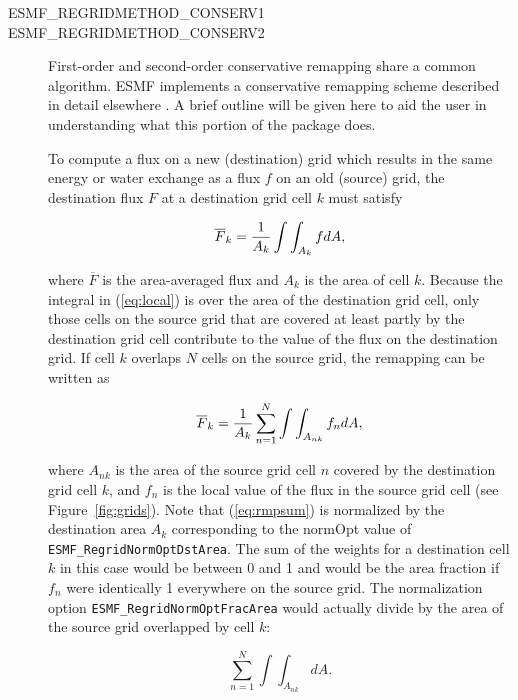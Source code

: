 \begin{description}
\item[ESMF\_REGRIDMETHOD\_CONSERV1]
\item[ESMF\_REGRIDMETHOD\_CONSERV2]
     First-order and second-order conservative remapping share a common algorithm.
     ESMF implements a conservative remapping scheme described in detail
     elsewhere \cite{Jones1999}.  A brief outline will be given
     here to aid the user in understanding what this portion of the package does.

     To compute a flux on a new (destination) grid which results in the same
     energy or water exchange as a flux $f$ on an old (source) grid, the
     destination flux $F$ at a destination grid cell $k$ must satisfy

\begin{equation}\label{eq:local}
\overline{F}_k = {1\over{A_k}}\int\int_{A_k} fdA,
\end{equation}

     where $\overline{F}$ is the area-averaged flux and $A_k$ is the area of
     cell $k$. Because the integral in (\ref{eq:local}) is over the area of 
     the destination grid cell, only those cells on the source grid that are
     covered at least partly by the destination grid cell contribute to the
     value of the flux on the destination grid.  If cell $k$ overlaps $N$ cells
     on the source grid, the remapping can be written as 

\begin{equation}\label{eq:rmpsum}
\overline{F}_k = 
{1\over{A_k}} \sum_{n=1}^N \int\int_{A_{nk}} f_ndA,
\end{equation}

     where $A_{nk}$ is the area of the source grid cell $n$ covered by the
     destination grid cell $k$, and $f_n$ is the local value of the flux in the
     source grid cell (see Figure~\ref{fig:grids}).  Note that (\ref{eq:rmpsum})
     is normalized by the destination area $A_k$ corresponding to the
     normOpt value of {\tt ESMF\_RegridNormOptDstArea}.  The sum of the weights for a
     destination cell $k$ in this case would be between 0 and 1 and would be the
     area fraction if $f_n$ were identically 1 everywhere on the source grid.
     The normalization option {\tt ESMF\_RegridNormOptFracArea} would actually
     divide by the area of the source grid overlapped by cell $k$: 

\begin{equation}
\sum_{n=1}^N \int\int_{A_{nk}}dA.
\end{equation}


\end{description}
